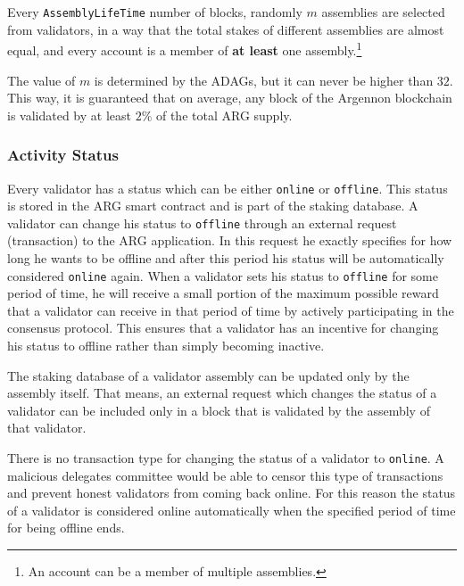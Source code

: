Every \texttt{AssemblyLifeTime} number of blocks, randomly $m$ assemblies are selected from
validators, in a way that the total stakes of different assemblies are almost equal, and every
account is a member of \textbf{at least} one assembly.\footnote{An account can be a member of multiple assemblies.}

The value of $m$ is determined by the ADAGs, but it can never be higher than $32$. This way, it is guaranteed
that on average, any block of the Argennon blockchain is validated by at least $2\%$ of the total ARG supply.

\subsubsection{Activity Status}

Every validator has a status which can be either \texttt{online} or \texttt{offline}.
This status is stored in the ARG smart contract and is part of the staking database. A validator can change
his status to \texttt{offline} through an external request (transaction) to the ARG application. In this request he
exactly specifies for how long he wants to be offline and after this period his status will be automatically considered
\texttt{online} again. When a validator sets his status to \texttt{offline} for some period of time, he
will receive a small portion of the maximum possible reward that a validator can receive in that period of time by
actively participating in the consensus protocol. This ensures that a validator has an incentive for changing his
status to offline rather than simply becoming inactive.

The staking database of a validator assembly can be updated only by the assembly itself. That means, an external
request which changes the status of a validator can be included only in a block that is validated by the assembly of
that validator.

There is no transaction type for changing the status of a validator to \texttt{online}. A malicious delegates committee
would be able to censor this type of transactions and prevent honest validators from coming back online. For this reason
the status of a validator is considered online automatically when the specified period of time for being offline ends.

